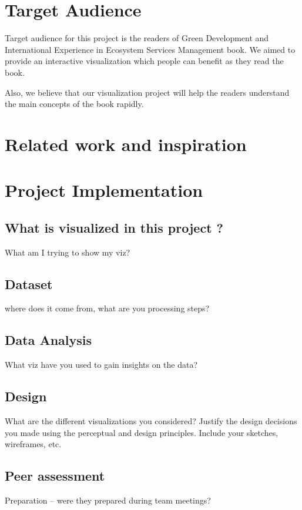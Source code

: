 \documentclass[a4paper]{article}
\begin{document}
\section{Target Audience}

Target audience for this project is the readers of Green Development and International Experience in Ecosystem Services Management book.
We aimed to provide an interactive visualization which people can benefit as they read the book.

Also, we believe that our visualization project will help the readers understand the main concepts of the book rapidly.
\section{Related work and inspiration}

\section{Project Implementation}

\subsection{What is visualized in this project ?}
What am I trying to show my viz?

\subsection{Dataset}
where does it come from, what are you processing steps?

\subsection{Data Analysis}
What viz have you used to gain insights on the data?

\subsection{Design}
What are the different visualizations you considered? Justify the design decisions you made using the perceptual and design principles.
Include your sketches, wireframes, etc.

\subsection{Peer assessment}

Preparation – were they prepared during team meetings?
\end{document}
